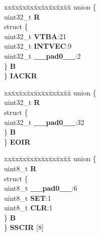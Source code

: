 \begin{DoxyCompactItemize}
\begin{tabbing}
\end{tabbing}\item 
\mbox{\label{structINTC__tag_af52fed03a0f0aacca252b9ea6a8d3da2}} 
\begin{tabbing}
xx\=xx\=xx\=xx\=xx\=xx\=xx\=xx\=xx\=\kill
union \{\\
\>uint32\_t {\bfseries R}\\
\>struct \{\\
\>\>uint32\_t {\bfseries VTBA}:21\\
\>\>uint32\_t {\bfseries INTVEC}:9\\
\>\>uint32\_t {\bfseries \_\_pad0\_\_}:2\\
\>\} {\bfseries B}\\
\} {\bfseries IACKR}\\

\end{tabbing}\item 
\mbox{\label{structINTC__tag_a7eb57ca23f9d7ef7a1012ae92de86ed6}} 
\begin{tabbing}
xx\=xx\=xx\=xx\=xx\=xx\=xx\=xx\=xx\=\kill
union \{\\
\>uint32\_t {\bfseries R}\\
\>struct \{\\
\>\>uint32\_t {\bfseries \_\_pad0\_\_}:32\\
\>\} {\bfseries B}\\
\} {\bfseries EOIR}\\

\end{tabbing}\item 
\mbox{\label{structINTC__tag_a12736620c1370163a405842f0cdb0f90}} 
\begin{tabbing}
xx\=xx\=xx\=xx\=xx\=xx\=xx\=xx\=xx\=\kill
union \{\\
\>uint8\_t {\bfseries R}\\
\>struct \{\\
\>\>uint8\_t {\bfseries \_\_pad0\_\_}:6\\
\>\>uint8\_t {\bfseries SET}:1\\
\>\>uint8\_t {\bfseries CLR}:1\\
\>\} {\bfseries B}\\
\} {\bfseries SSCIR} \mbox{[}8\mbox{]}\\


\end{tabbing}
\end{DoxyCompactItemize}
